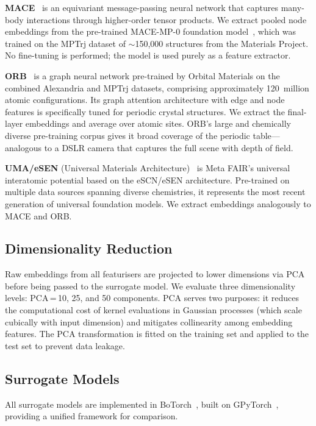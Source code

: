 \textbf{MACE}~\cite{batatia2022mace,batatia2024foundation} is an equivariant message-passing neural network that captures many-body interactions through higher-order tensor products.
We extract pooled node embeddings from the pre-trained MACE-MP-0 foundation model~\cite{batatia2024foundation}, which was trained on the MPTrj dataset of $\sim$150{,}000 structures from the Materials Project.
No fine-tuning is performed; the model is used purely as a feature extractor.

\textbf{ORB}~\cite{orb2024} is a graph neural network pre-trained by Orbital Materials on the combined Alexandria and MPTrj datasets, comprising approximately 120~million atomic configurations.
Its graph attention architecture with edge and node features is specifically tuned for periodic crystal structures.
We extract the final-layer embeddings and average over atomic sites.
ORB's large and chemically diverse pre-training corpus gives it broad coverage of the periodic table---analogous to a DSLR camera that captures the full scene with depth of field.

\textbf{UMA/eSEN} (Universal Materials Architecture)~\cite{uma2025} is Meta FAIR's universal interatomic potential based on the eSCN/eSEN architecture.
Pre-trained on multiple data sources spanning diverse chemistries, it represents the most recent generation of universal foundation models.
We extract embeddings analogously to MACE and ORB.


\subsection{Dimensionality Reduction}
\label{sec:pca}

Raw embeddings from all featurisers are projected to lower dimensions via PCA~\cite{jolliffe2002principal} before being passed to the surrogate model.
We evaluate three dimensionality levels: PCA\,=\,10, 25, and 50 components.
PCA serves two purposes: it reduces the computational cost of kernel evaluations in Gaussian processes (which scale cubically with input dimension) and mitigates collinearity among embedding features.
The PCA transformation is fitted on the training set and applied to the test set to prevent data leakage.


\subsection{Surrogate Models}
\label{sec:surrogates}

All surrogate models are implemented in BoTorch~\cite{balandat2020botorch}, built on GPyTorch~\cite{gardner2018gpytorch}, providing a unified framework for comparison.

